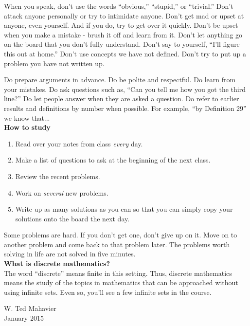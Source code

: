 When you speak, don't use the words ``obvious,'' ``stupid,'' or ``trivial.''  Don't attack anyone personally or try to intimidate anyone.  Don't get mad or upset at anyone, even yourself.  And if you do, try to get over it quickly.  Don't be upset when you make a mistake - brush it off and learn from it.  Don't let anything go on the board that you don't fully understand. Don't say to yourself, ``I'll figure this out at home.''  Don't use concepts we have not defined. Don't try to put up a problem you have not written up.

Do prepare arguments in advance.  Do be polite and respectful.  Do learn from your mistakes. Do ask questions such as, ``Can you tell me how you got the third line?''  Do let people answer when they are asked a question.  Do refer to earlier results and definitions by number when possible. For example, ``by Definition 29'' we know that...\\

\noindent
\textbf{How to study}

\begin{enumerate}
\item Read over your notes from class \emph{every} day.
\item Make a list of questions to ask at the beginning of the next class.
\item Review the recent problems.
\item Work on \emph{several} new problems.
\item Write up as many solutions as you can so that you can simply copy your
solutions onto the board the next day.
\end{enumerate}

Some problems are hard.   If you don't get one, don't give up on it.  Move on to another problem and come back to that problem later.  The problems worth solving in life are not solved in five minutes.\\

\noindent
\textbf{What is discrete mathematics?}\\

The word ``discrete'' means finite in this setting.   Thus, discrete mathematics means the study of the topics in mathematics that can be approached without using infinite sets.  Even so, you'll see a few infinite sets in the course.
\medskip

\noindent W. Ted Mahavier\\
January 2015






